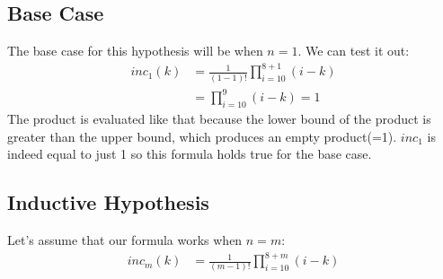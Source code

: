 \documentclass[titlepage,12pt]{article}
\begin{document}
\subsection{Base Case}
The base case for this hypothesis will be when $n=1$. We can test it out:
\begin{align*}
    inc_1(k) &= \frac{1}{(1-1)!} \prod_{i=10}^{8+1} (i-k)\\
    &= \prod_{i=10}^{9} (i-k) = 1
\end{align*}
The product is evaluated like that because the lower bound of the product is greater than the upper bound, which produces an empty product(=1). $inc_1$ is indeed equal to just 1 so this formula holds true for the base case.

\subsection{Inductive Hypothesis}
Let's assume that our formula works when $n=m$:
\begin{align*}
    inc_m(k) &= \frac{1}{(m-1)!} \prod_{i=10}^{8+m} (i-k)
\end{align*}
\end{document}
